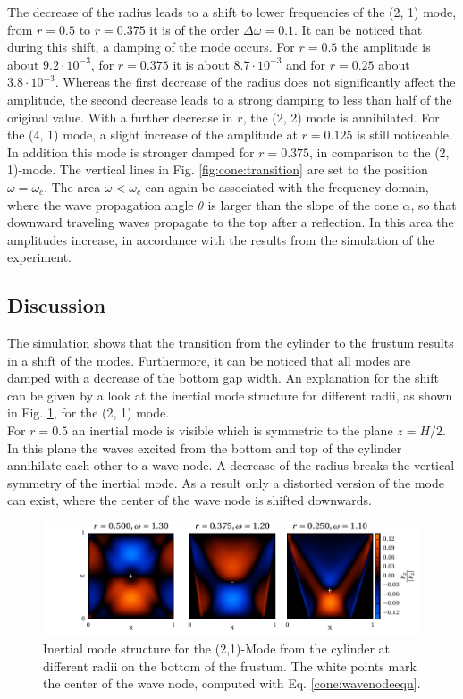 The decrease of the radius leads to a shift to lower frequencies of the (2, 1) mode,
from $r=0.5$ to $r=0.375$ it is of the order $\Delta \omega=0.1$.
It can be noticed that during this shift, a damping of the mode occurs.
For $r=0.5$ the amplitude is about $9.2\cdot10^{-3}$, for $r=0.375$ it is
about $8.7\cdot10^{-3}$ and for $r=0.25$ about $3.8\cdot10^{-3}$.
Whereas the first decrease of the radius does not significantly affect the amplitude,
the second decrease leads to a strong damping to less than half of the original value.
With a further decrease in $r$, the (2, 2) mode is annihilated.
For the (4, 1) mode, a slight increase of the amplitude at $r=0.125$ is still noticeable.
In addition this mode is stronger damped for $r=0.375$, in comparison to the (2, 1)-mode.
The vertical lines in Fig. \ref{fig:cone:transition} are set to the position $\omega=\omega_c$.
The area $\omega<\omega_c$ can again be associated with the frequency domain, where the wave propagation angle $\theta$ is larger than
the  slope of the cone $\alpha$, so that downward traveling waves propagate to the top after a reflection.
In this area the amplitudes increase, in accordance with the
results from the simulation of the experiment.

\subsection{Discussion}%
\label{cone:discussion_transition}

The simulation shows that the transition from the cylinder
to the frustum results in a shift of the modes.
Furthermore, it can be noticed that all modes are damped with a decrease of the bottom gap width.
An explanation for the shift can be given by a look at the inertial mode structure
for different radii, as shown in Fig. \ref{fig:cone:phase}, for the (2, 1) mode.\\
For $r=0.5$ an inertial mode is visible which is symmetric to the plane $z=H/2$.
In this plane the waves excited from the bottom and top of the cylinder annihilate each other to a wave node.
A decrease of the radius breaks the vertical symmetry of the inertial mode.
As a result only a distorted version of the mode can exist, where the center of the wave node
is shifted downwards.

\begin{figure}[!b]
  \centering
  \includegraphics{gfx/cone/transition/phase.pdf}
  \caption{\label{fig:cone:phase}
    Inertial mode structure for the (2,1)-Mode from the cylinder at different radii on the bottom of the frustum.
    The white points mark the center of the wave node, computed with Eq.  \ref{cone:wavenodeeqn}.
  }
\end{figure}

